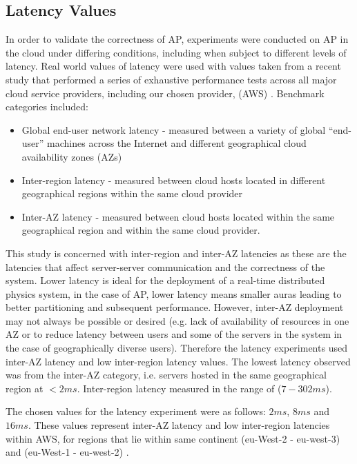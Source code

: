 
\subsection{Latency Values}
In order to validate the correctness of AP, experiments were conducted on AP in the cloud under differing conditions, including when subject to different levels of latency. Real world values of latency were used with values taken from a recent study that performed a series of exhaustive performance tests across all major cloud service providers, including our chosen provider, (AWS) \cite{ThousandEyesCloudPerf2019}. Benchmark categories included:
\begin{itemize}
	\item Global end-user network latency - measured between a variety of global ``end-user'' machines across the Internet and different geographical cloud availability zones (AZs)
	\item Inter-region latency - measured between cloud hosts located in different geographical regions within the same cloud provider
	\item Inter-AZ latency - measured between cloud hosts located within the same geographical region and within the same cloud provider.
\end{itemize}

This study is concerned with inter-region and inter-AZ latencies as these are the latencies that affect server-server communication and the correctness of the system. Lower latency is ideal for the deployment of a real-time distributed physics system, in the case of AP, lower latency means smaller auras leading to better partitioning and subsequent performance. However, inter-AZ deployment may not always be possible or desired (e.g. lack of availability of resources in one AZ or to reduce latency between users and some of the servers in the system in the case of geographically diverse users). Therefore the latency experiments used inter-AZ latency and low inter-region latency values. The lowest latency observed was from the inter-AZ category, i.e. servers hosted in the same geographical region at $<2ms$. Inter-region latency measured in the range of ($7-302ms$). 

The chosen values for the latency experiment were as follows: $2ms$, $8ms$ and $16ms$. These values represent inter-AZ latency and low inter-region latencies within AWS, for regions that lie within same continent (eu-West-2 - eu-west-3) and (eu-West-1 - eu-west-2) \cite{ThousandEyesCloudPerf2019}.

